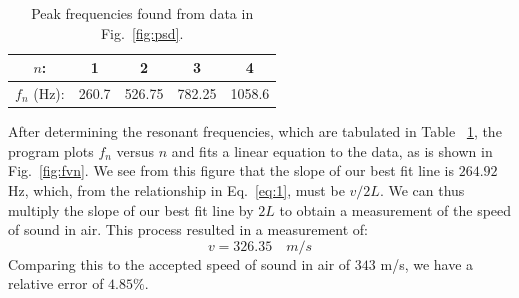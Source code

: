 \documentclass[12pt]{article}
\begin{document}
\begin{table}[h]
\begin{center}
\begin{tabular}{ |c|c|c|c|c| }
 \hline
 $n$: & 1 & 2 & 3 & 4 \\
 \hline
 $f_n$ (Hz): & 260.7 & 526.75 & 782.25 & 1058.6 \\
 \hline
\end{tabular}
\end{center}
\caption{Peak frequencies found from data in Fig.~\ref{fig:psd}.}
\label{table:1}
\end{table}
After determining the resonant frequencies, which are tabulated in Table
~\ref{table:1}, the program plots $f_n$ versus $n$ and fits a linear equation 
to the data, as is shown in Fig.~\ref{fig:fvn}. We see from this figure that
the slope of our best fit line is $264.92$ Hz, which, from the relationship 
in Eq.~\ref{eq:1}, must be
$v/2L$. We can thus multiply the slope of our best fit line by $2L$ to obtain
a measurement of the speed of sound in air. This process resulted in a 
measurement of:
\begin{equation} \label{eq:2}
v = 326.35 \quad m/s
\end{equation}
Comparing this to the accepted speed of sound in air of $343$ m/s, we have a
relative error of $4.85\%$.
\end{document}
